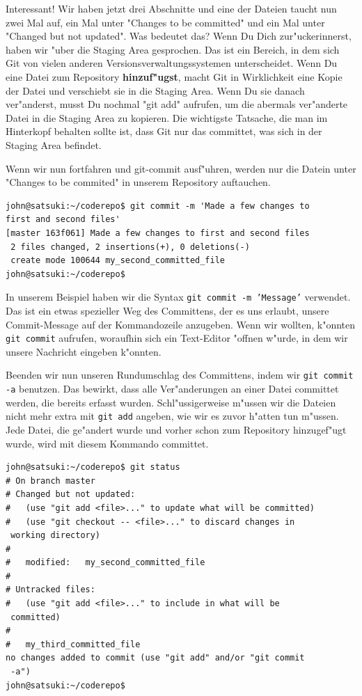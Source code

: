 Interessant! Wir haben jetzt drei Abschnitte und eine der Dateien taucht nun zwei Mal auf, ein Mal unter "Changes to be committed" und ein Mal unter "Changed but not updated". Was bedeutet das? Wenn Du Dich zur"uckerinnerst, haben wir "uber die Staging Area gesprochen. Das ist ein Bereich, in dem sich Git von vielen anderen Versionsverwaltungssystemen unterscheidet. Wenn Du eine Datei zum Repository \textbf{hinzuf"ugst}, macht Git in Wirklichkeit eine Kopie der Datei und verschiebt sie in die Staging Area. Wenn Du sie danach ver"anderst, musst Du nochmal "git add" aufrufen, um die abermals ver"anderte Datei in die Staging Area zu kopieren. Die wichtigste Tatsache, die man im Hinterkopf behalten sollte ist, dass Git nur das committet, was sich in der Staging Area befindet.

Wenn wir nun fortfahren und git-commit ausf"uhren, werden nur die Datein unter "Changes to be commited" in unserem Repository auftauchen.

\begin{Verbatim}
john@satsuki:~/coderepo$ git commit -m 'Made a few changes to 
first and second files'
[master 163f061] Made a few changes to first and second files
 2 files changed, 2 insertions(+), 0 deletions(-)
 create mode 100644 my_second_committed_file
john@satsuki:~/coderepo$ 
\end{Verbatim} 

In unserem Beispiel haben wir die Syntax \texttt{git commit -m 'Message'} verwendet. Das ist ein etwas spezieller Weg des Committens, der es uns erlaubt, unsere Commit-Message auf der Kommandozeile anzugeben. Wenn wir wollten, k"onnten \texttt{git commit} aufrufen, woraufhin sich ein Text-Editor "offnen w"urde, in dem wir unsere Nachricht eingeben k"onnten.  

Beenden wir nun unseren Rundumschlag des Committens, indem wir \texttt{git commit -a} benutzen. Das bewirkt, dass alle Ver"anderungen an einer Datei committet werden, die bereits erfasst wurden. Schl"ussigerweise m"ussen wir die Dateien nicht mehr extra mit \texttt{git add} angeben, wie wir es zuvor h"atten tun m"ussen.  Jede Datei, die ge"andert wurde und vorher schon zum Repository hinzugef"ugt wurde, wird mit diesem Kommando committet.

\begin{Verbatim}
john@satsuki:~/coderepo$ git status
# On branch master
# Changed but not updated:
#   (use "git add <file>..." to update what will be committed)
#   (use "git checkout -- <file>..." to discard changes in 
 working directory)
#
#	modified:   my_second_committed_file
#
# Untracked files:
#   (use "git add <file>..." to include in what will be 
 committed)
#
#	my_third_committed_file
no changes added to commit (use "git add" and/or "git commit 
 -a")
john@satsuki:~/coderepo$ 
\end{Verbatim} 

